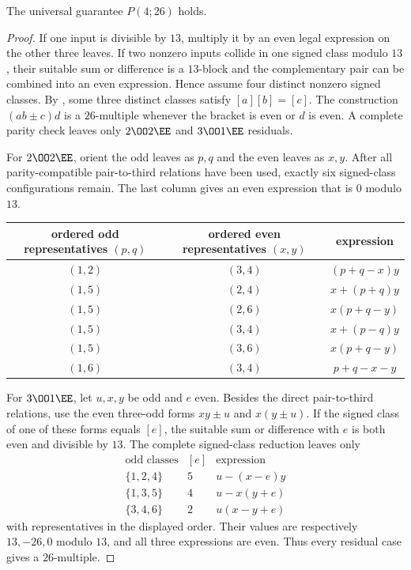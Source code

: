 \begin{theorem}\label{thm:p26}
The universal guarantee $P(4;26)$ holds.
\end{theorem}
\begin{proof}
If one input is divisible by $13$, multiply it by an even legal expression on
the other three leaves.  If two nonzero inputs collide in one signed class
modulo $13$, their suitable sum or difference is a $13$-block and the
complementary pair can be combined into an even expression.  Hence assume
four distinct nonzero signed classes.  By , some
three distinct classes satisfy $[a][b]=[c]$.  The construction $(ab\pm c)d$
is a $26$-multiple whenever the bracket is even or $d$ is even.  A complete
parity check leaves only $2\OO2\EE$ and $3\OO1\EE$ residuals.

For $2\OO2\EE$, orient the odd leaves as $p,q$ and the even leaves as $x,y$.
After all parity-compatible pair-to-third relations have been used, exactly
six signed-class configurations remain.  The last column gives an even
expression that is $0$ modulo $13$.
\small
\begin{center}
\begin{tabular}{@{}ccc@{}}
\toprule
ordered odd representatives $(p,q)$ & ordered even representatives $(x,y)$ & expression \\
\midrule
$(1,2)$&$(3,4)$&$(p+q-x)y$\\
$(1,5)$&$(2,4)$&$x+(p+q)y$\\
$(1,5)$&$(2,6)$&$x(p+q-y)$\\
$(1,5)$&$(3,4)$&$x+(p-q)y$\\
$(1,5)$&$(3,6)$&$x(p+q-y)$\\
$(1,6)$&$(3,4)$&$p+q-x-y$\\
\bottomrule
\end{tabular}
\end{center}
\normalsize

For $3\OO1\EE$, let $u,x,y$ be odd and $e$ even.  Besides the direct
pair-to-third relations, use the even three-odd forms $xy\pm u$ and
$x(y\pm u)$.  If the signed class of one of these forms equals $[e]$, the
suitable sum or difference with $e$ is both even and divisible by $13$.
The complete signed-class reduction leaves only
\[
\begin{array}{c|c|c}
\text{odd classes}&[e]&\text{expression}\\ \hline
\{1,2,4\}&5&u-(x-e)y\\
\{1,3,5\}&4&u-x(y+e)\\
\{3,4,6\}&2&u(x-y+e)
\end{array}
\]
with representatives in the displayed order.  Their values are respectively
$13,-26,0$ modulo $13$, and all three expressions are even.  Thus every
residual case gives a $26$-multiple.
\end{proof}

